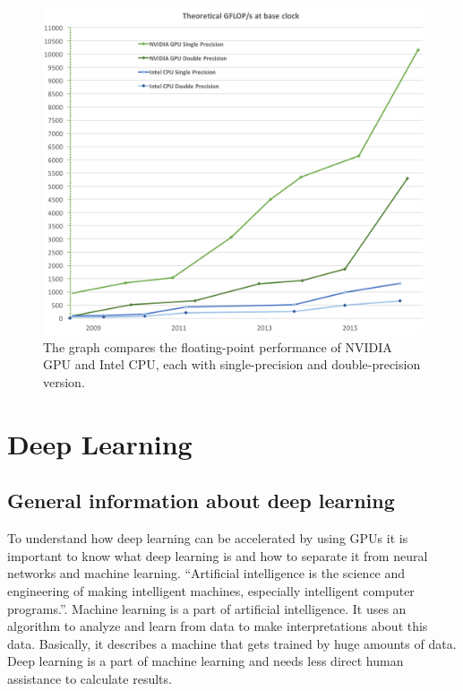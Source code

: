 \documentclass[conference]{IEEEtran}
\begin{document}
\begin{figure}[H]
    \centering
    \includegraphics[scale=0.2]{PeakFlopsCPUGPU.png}
    \caption{The graph compares the floating-point performance of NVIDIA GPU and Intel CPU, each with single-precision and double-precision version. \cite{b22}}
    \label{fig:enter-label1}
\end{figure}







\section{Deep Learning}
\subsection{General information about deep learning}

To understand how deep learning can be accelerated by using GPUs it is important to know what deep learning is and how to separate it from neural networks and machine learning. “Artificial intelligence is the science and engineering of making intelligent machines, especially intelligent computer programs.”\cite{b8}. Machine learning is a part of artificial intelligence. It uses an algorithm to analyze and learn from data to make interpretations about this data. Basically, it describes a machine that gets trained by huge amounts of data. Deep learning is a part of machine learning and needs less direct human assistance to calculate results.\cite{b9}
\end{document}
